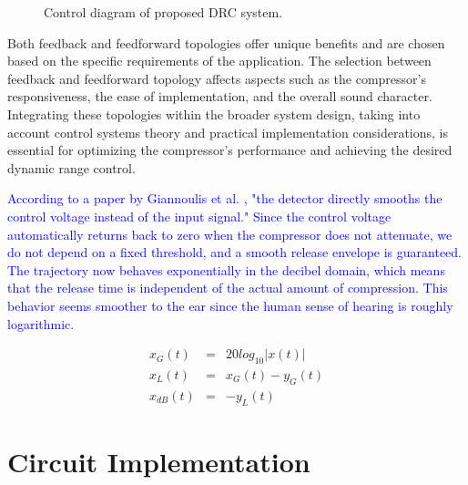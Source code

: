 \documentclass[10pt]{article}
\begin{document}
\begin{multicols*}{2}
\begin{figure*}[!th]

                    \caption{Control diagram of proposed DRC system.}
                    \label{fig:drc-diagram}

                \end{figure*}

                Both feedback and feedforward topologies offer unique benefits and are chosen based on the specific requirements of the application. The selection between feedback and feedforward topology affects aspects such as the compressor's responsiveness, the ease of implementation, and the overall sound character. Integrating these topologies within the broader system design, taking into account control systems theory and practical implementation considerations, is essential for optimizing the compressor's performance and achieving the desired dynamic range control.\par
                \textcolor{blue}{According to a paper by Giannoulis et al. \cite{drc-tutorial}, "the detector directly smooths the control voltage instead of the input signal." Since the control voltage automatically returns back to zero when the compressor does not attenuate, we do not depend on a fixed threshold, and a smooth release envelope is guaranteed. The trajectory now behaves exponentially in the decibel domain, which means that the release time is independent of the actual amount of compression. This behavior seems smoother to the ear since the human sense of hearing is roughly logarithmic.} 

                \begin{eqnarray}
                    x_G(t)&=&20log_{10}|x(t)|\\
                    x_L(t)&=&x_G(t)-y_G(t)\\
                    x_{dB}(t)&=&-y_L(t)
                \end{eqnarray}
                        
        \section{Circuit Implementation}


\end{multicols*}
\end{document}
